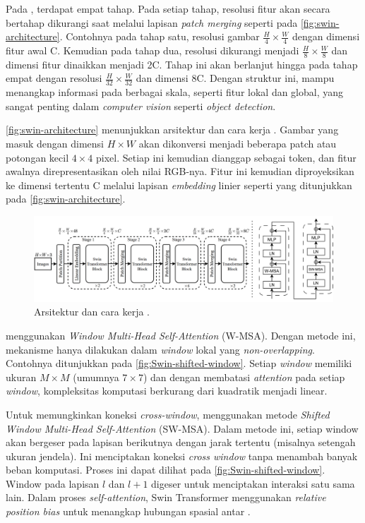 Pada \swin, terdapat empat tahap. Pada setiap tahap, resolusi fitur akan secara bertahap dikurangi saat melalui lapisan \emph{patch merging} seperti pada \autoref{fig:swin-architecture}. Contohnya pada tahap satu, resolusi gambar $\frac{H}{4} \times \frac{W}{4}$ dengan dimensi fitur awal C. Kemudian pada tahap dua, resolusi dikurangi menjadi $\frac{H}{8} \times \frac{W}{8}$ dan 
dimensi fitur dinaikkan menjadi 2C. Tahap ini akan berlanjut hingga pada tahap empat dengan resolusi $\frac{H}{32} \times \frac{W}{32}$ dan dimensi 8C. Dengan struktur ini, \swin{} mampu menangkap informasi pada berbagai skala, seperti fitur lokal 
dan global, yang sangat penting dalam \emph{computer vision} seperti \emph{object detection}. 

\autoref{fig:swin-architecture} menunjukkan arsitektur dan cara kerja \swin. Gambar yang masuk dengan dimensi $H \times W$ akan dikonversi menjadi beberapa patch atau potongan kecil $4 \times 4$ pixel. Setiap \patch{} ini kemudian dianggap sebagai token, dan fitur awalnya direpresentasikan oleh nilai RGB-nya. Fitur ini kemudian 
diproyeksikan ke dimensi tertentu C melalui lapisan \emph{embedding} linier seperti yang ditunjukkan pada \autoref{fig:swin-architecture}.

\begin{figure}[htbp]
    \centering
    \includegraphics[width=1\textwidth]{images/swin-architecture.png}
    \caption{Arsitektur dan cara kerja \swin{} \parencite{liu2021swin}.}
    \label{fig:swin-architecture}
\end{figure}

\swin{} menggunakan \emph{Window Multi-Head Self-Attention} (W-MSA). Dengan metode ini, mekanisme \selfattention{} hanya dilakukan dalam \emph{window} lokal yang \emph{non-overlapping}. Contohnya ditunjukkan pada \autoref{fig:Swin-shifted-window}. 
Setiap \emph{window} memiliki ukuran $M \times M$ (umumnya $7 \times 7$) dan dengan membatasi \emph{attention} pada setiap \emph{window}, kompleksitas komputasi berkurang dari kuadratik menjadi linear.

Untuk memungkinkan koneksi \emph{cross-window}, \swin{} 
menggunakan metode \emph{Shifted Window Multi-Head Self-Attention} (SW-MSA). 
Dalam metode ini, setiap window akan bergeser pada lapisan berikutnya dengan jarak tertentu (misalnya setengah ukuran jendela). Ini menciptakan koneksi \emph{cross window} tanpa menambah banyak beban komputasi. Proses ini dapat dilihat pada \autoref{fig:Swin-shifted-window}. Window pada lapisan $l$ dan $l+1$ digeser untuk menciptakan interaksi 
satu sama lain. Dalam proses \emph{self-attention}, Swin Transformer menggunakan \textit{relative position bias} untuk menangkap hubungan spasial antar \patch.
